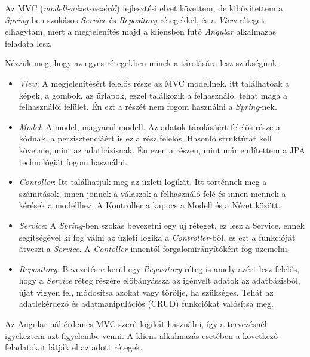 

Az MVC (\textit{modell-nézet-vezérlő}) fejlesztési elvet követtem, de kibővítettem a \textit{Spring}-ben szokásos \textit{Service} és \textit{Repository} rétegekkel, és a \textit{View} réteget elhagytam, mert a megjelenítés majd a kliensben futó \textit{Angular} alkalmazás feladata lesz.

Nézzük meg, hogy az egyes rétegekben minek a tárolására lesz szükségünk.
\begin{itemize}
\item \textit{View}: A megjelenítésért felelős része az MVC modellnek, itt találhatóak a képek, a gombok, az űrlapok, ezzel találkozik a felhasználó, tehát maga a felhasználói felület. Én ezt a részét nem fogom használni a \textit{Spring}-nek.
\item \textit{Model}: A model, magyarul modell. Az adatok tárolásáért felelős része a kódnak, a perzisztenciáért is ez a rész felelős. Hasonló struktúrát kell követnie, mint az adatbázisnak. Én ezen a részen, mint már említettem a JPA technológiát fogom használni.
\item \textit{Contoller}: Itt találhatjuk meg az üzleti logikát. Itt történnek meg a számítások, innen jönnek a válaszok a felhasználó felé és innen mennek a kérések a modellhez. A Kontroller a kapocs a Modell és a Nézet között.
\item \textit{Service}: A \textit{Spring}-ben szokás bevezetni egy új réteget, ez lesz a Service, ennek segítségével ki fog válni az üzleti logika a \textit{Controller}-ből, és ezt a funkcióját átveszi a \textit{Service}. A \textit{Contoller} innentől forgalomirányítóként fog üzemelni.
\item \textit{Repository}: Bevezetésre kerül egy \textit{Repository} réteg is amely azért lesz felelős, hogy a \textit{Service} réteg részére előbányássza az igényelt adatok az adatbázisból, újat vigyen fel, módosítsa azokat vagy törölje, ha szükséges. 
Tehát az adatlekérdező és adatmanipulációs (CRUD) funkciókat valósítsa meg.
\end{itemize}


Az Angular-nál érdemes MVC szerű logikát használni, így a tervezésnél igyekeztem azt figyelembe venni. A kliens alkalmazás esetében a következő feladatokat látják el az adott rétegek.

